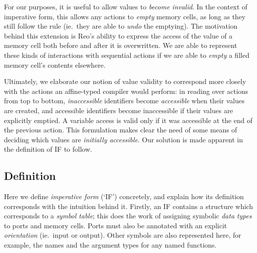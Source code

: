 For our purposes, it is useful to allow values to \textit{become invalid}. In the context of imperative form, this allows any actions to \textit{empty} memory cells, as long as they still follow the rule (ie.\ they are able to \textit{undo} the emptying). The motivation behind this extension is Reo's ability to express the access of the value of a memory cell both before and after it is overwritten. We are able to represent these kinds of interactions with sequential actions if we are able to \textit{empty} a filled memory cell's contents elsewhere. 

Ultimately, we elaborate our notion of value validity to correspond more closely with the actions an affine-typed compiler would perform: in reading over actions from top to bottom, \textit{inaccessible} identifiers become \textit{accessible} when their values are created, and accessible identifiers become inaccessible if their values are explicitly emptied. A variable access is valid only if it was accessible at the end of the previous action. This formulation makes clear the need of some means of deciding which values are \textit{initially accessible}. Our solution is made apparent in the definition of IF to follow.

\subsection{Definition}
\label{sec:imperative_form_definition}
Here we define \textit{imperative form} (`IF') concretely, and explain how its definition corresponds with the intuition behind it. Firstly, an IF contains a structure which corresponds to a \textit{symbol table}; this does the work of assigning symbolic \textit{data types} to ports and memory cells. Ports must also be annotated with an explicit \textit{orientation} (ie.\ input or output). Other symbols are also represented here, for example, the names and the argument types for any named functions.

